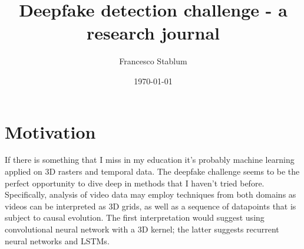 \documentclass{article}
\title{Deepfake detection challenge - a research journal}
\author{Francesco Stablum}
\date{\today}
\begin{document}
\maketitle

\section{Motivation}

If there is something that I miss in my education it's probably
machine learning applied on 3D rasters and temporal data.
The deepfake challenge seems to be the perfect opportunity
to dive deep in methods that I haven't tried before.
Specifically, analysis of video data may employ techniques from both domains
as videos can be interpreted as 3D grids, as well as a sequence of datapoints that
is subject to causal evolution. The first interpretation would suggest using
convolutional neural network with a 3D kernel; the latter suggests recurrent neural networks
and LSTMs.






{}

\end{document}
